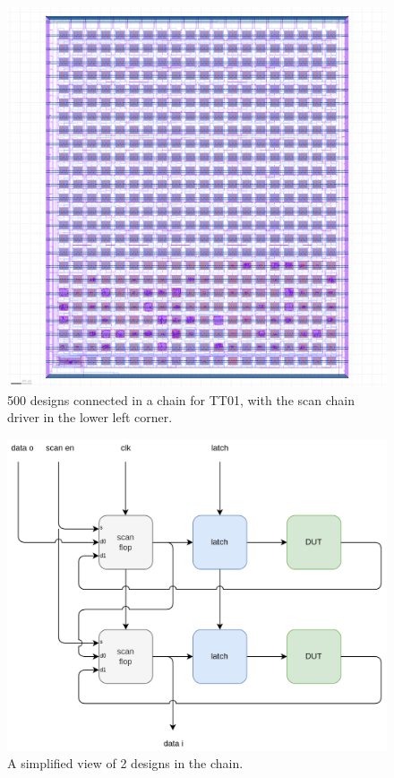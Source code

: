 \begin{figure}[htp]
\centering
\includegraphics[width=1\columnwidth]{./Figs/tt01_whole_die.png}
\caption{500 designs connected in a chain for TT01, with the scan chain driver in the lower left corner.}
\label{fig:500_designs_chain_TT01}
\end{figure}

\begin{figure}[htp]
\centering
\includegraphics[width=\columnwidth]{./Figs/scanchain_block_diagram.png}
\caption{A simplified view of 2 designs in the chain.}
\label{fig:simplified_view_2_designs}
\end{figure}


